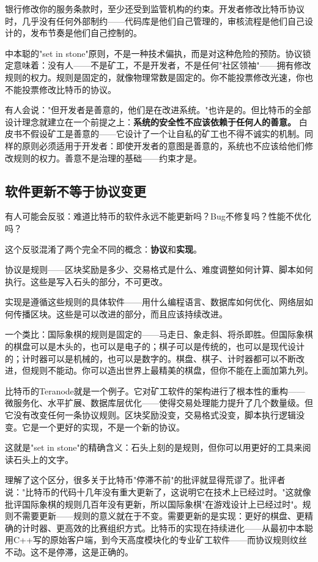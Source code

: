 \documentclass[a4paper,12pt,openany]{ctexbook}
\begin{document}
银行修改你的服务条款时，至少还受到监管机构的约束。开发者修改比特币协议时，几乎没有任何外部制约——代码库是他们自己管理的，审核流程是他们自己设计的，发布节奏是他们自己控制的。

中本聪的"set in stone"原则，不是一种技术偏执，而是对这种危险的预防。协议锁定意味着：没有人——不是矿工，不是开发者，不是任何"社区领袖"——拥有修改规则的权力。规则是固定的，就像物理常数是固定的。你不能投票修改光速，你也不能投票修改比特币的协议。

有人会说："但开发者是善意的，他们是在改进系统。"也许是的。但比特币的全部设计理念就建立在一个前提之上：\textbf{系统的安全性不应该依赖于任何人的善意。} 白皮书不假设矿工是善意的——它设计了一个让自私的矿工也不得不诚实的机制。同样的原则必须适用于开发者：即使开发者的意图是善意的，系统也不应该给他们修改规则的权力。善意不是治理的基础——约束才是。


\subsection*{软件更新不等于协议变更}


有人可能会反驳：难道比特币的软件永远不能更新吗？Bug不修复吗？性能不优化吗？

这个反驳混淆了两个完全不同的概念：\textbf{协议}和\textbf{实现}。

协议是规则——区块奖励是多少、交易格式是什么、难度调整如何计算、脚本如何执行。这些是写入石头的部分，不可更改。

实现是遵循这些规则的具体软件——用什么编程语言、数据库如何优化、网络层如何传播区块。这些是可以改进的部分，而且应该持续改进。

一个类比：国际象棋的规则是固定的——马走日、象走斜、将杀即胜。但国际象棋的棋盘可以是木头的，也可以是电子的；棋子可以是传统的，也可以是现代设计的；计时器可以是机械的，也可以是数字的。棋盘、棋子、计时器都可以不断改进，但规则不能动。你可以造出世界上最精美的棋盘，但你不能在上面加第九列。

比特币的Teranode就是一个例子。它对矿工软件的架构进行了根本性的重构——微服务化、水平扩展、数据库层优化——使得交易处理能力提升了几个数量级。但它没有改变任何一条协议规则。区块奖励没变，交易格式没变，脚本执行逻辑没变。它是一个更好的实现，不是一个新的协议。

这就是"set in stone"的精确含义：石头上刻的是规则，但你可以用更好的工具来阅读石头上的文字。

理解了这个区分，很多关于比特币"停滞不前"的批评就显得荒谬了。批评者说："比特币的代码十几年没有重大更新了，这说明它在技术上已经过时。"这就像批评国际象棋的规则几百年没有更新，所以国际象棋"在游戏设计上已经过时"。规则不需要更新——规则的意义就在于不变。需要更新的是实现：更好的棋盘、更精确的计时器、更高效的比赛组织方式。比特币的实现在持续进化——从最初中本聪用C++写的原始客户端，到今天高度模块化的专业矿工软件——而协议规则纹丝不动。这不是停滞，这是正确的。
\end{document}

